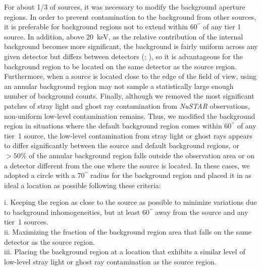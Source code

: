 \documentclass[iop,revtex4]{emulateapj}
\begin{document}
For about 1/3 of sources, it was necessary to modify the background aperture regions.  In order to prevent contamination to the background from other sources, it is preferable for background regions not to extend within 60$^{\prime\prime}$ of any tier 1 source.  In addition, above 20~keV, as the relative contribution of the internal background becomes more significant, the background is fairly uniform across any given detector but differs between detectors (\citealt{harrison13}; \citealt{wik14}), so it is advantageous for the background region to be located on the same detector as the source region.  Furthermore, when a source is located close to the edge of the field of view, using an annular background region may not sample a statistically large enough number of background counts.  Finally, although we removed the most significant patches of stray light and ghost ray contamination from \textit{NuSTAR} observations, non-uniform low-level contamination remains.  Thus, we modified the background region in situations where the default background region comes within 60$^{\prime\prime}$ of any tier~1 source, the low-level contamination from stray light or ghost rays appears to differ significantly between the source and default background regions, or $>50\%$ of the annular background region falls outside the observation area or on a detector different from the one where the source is located.  In these cases, we adopted a circle with a 70$^{\prime\prime}$ radius for the background region and placed it in as ideal a location as possible following these criteria: 
\begin{list}{}{%
\setlength{\topsep}{0pt}%
\setlength{\leftmargin}{0.3in}%
\setlength{\listparindent}{0.0in}%
\setlength{\itemindent}{0.0in}%
\setlength{\parsep}{\parskip}%
\setlength{\itemsep}{0pt}
}%
\item[]
i. Keeping the region as close to the source as possible to minimize variations due to background inhomogeneities, but at least 60$^{\prime\prime}$ away from the source and any tier~1 sources.  \\
ii. Maximizing the fraction of the background region area that falls on the same detector as the source region. \\
iii. Placing the background region at a location that exhibits a similar level of low-level stray light or ghost ray contamination as the source region.  
\end{list}
\par
\end{document}
